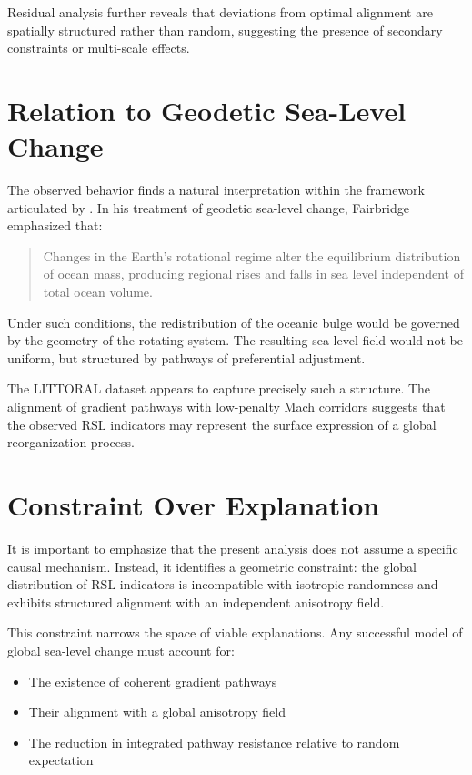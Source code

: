 \documentclass[twocolumn]{article}
\begin{document}
Residual analysis further reveals that deviations from optimal alignment are spatially structured rather than random, suggesting the presence of secondary constraints or multi-scale effects.

\section{Relation to Geodetic Sea-Level Change}

The observed behavior finds a natural interpretation within the framework articulated by \citet{fairbridge1961}. In his treatment of geodetic sea-level change, Fairbridge emphasized that:

\begin{quote}
Changes in the Earth's rotational regime alter the equilibrium distribution of ocean mass, producing regional rises and falls in sea level independent of total ocean volume.
\end{quote}

Under such conditions, the redistribution of the oceanic bulge would be governed by the geometry of the rotating system. The resulting sea-level field would not be uniform, but structured by pathways of preferential adjustment.

The LITTORAL dataset appears to capture precisely such a structure. The alignment of gradient pathways with low-penalty Mach corridors suggests that the observed RSL indicators may represent the surface expression of a global reorganization process.

\section{Constraint Over Explanation}

It is important to emphasize that the present analysis does not assume a specific causal mechanism. Instead, it identifies a geometric constraint: the global distribution of RSL indicators is incompatible with isotropic randomness and exhibits structured alignment with an independent anisotropy field.

This constraint narrows the space of viable explanations. Any successful model of global sea-level change must account for:

\begin{itemize}
\item The existence of coherent gradient pathways
\item Their alignment with a global anisotropy field
\item The reduction in integrated pathway resistance relative to random expectation
\end{itemize}
\end{document}
